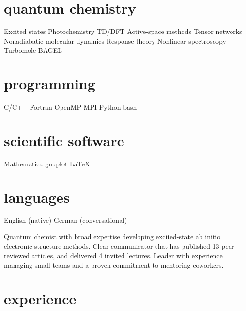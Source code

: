 \documentclass[resume]{parker-cv}
\renewcommand{\LARGE}{\fontsize{16}{18}\selectfont}
\newcommand{\askip}{\vspace{0.5em}}
\begin{document}

\begin{aside}
\section{quantum chemistry}
Excited states \askip
Photochemistry \askip
TD/DFT \askip
Active-space methods \askip
Tensor networks \askip
Nonadiabatic molecular dynamics \askip
Response theory \askip
Nonlinear spectroscopy \askip
Turbomole \askip
BAGEL \askip
\section{programming}
C/C++ \askip
Fortran \askip
OpenMP \askip
MPI \askip
Python \askip
bash \askip
\section{scientific software}
Mathematica \askip
gnuplot \askip
LaTeX \askip
\section{languages}
English (native) \askip
German (conversational) \askip
\end{aside}
\makebox[\textwidth]{{\LARGE\headingfont\color{gray} summary}}\vspace{0.25em}
Quantum chemist with broad expertise developing
excited-state ab initio electronic structure methods.
Clear communicator that has published 13 peer-reviewed articles,
and delivered 4 invited lectures.
Leader with experience managing small teams and a proven commitment
to mentoring coworkers.

\section{experience}\vspace{-0.5em}
\end{document}
